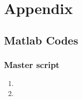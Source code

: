 \graphicspath{{figure_Appendix/}}%

\section{Appendix}



\subsection{Matlab Codes}
\subsubsection{Master script}


\begin{enumerate}
\item 
\item
\end{enumerate}